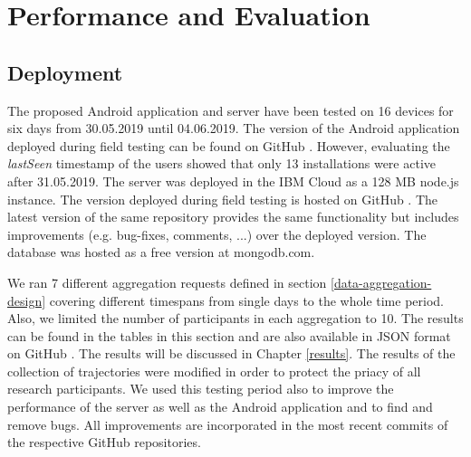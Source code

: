 \chapter{Performance and Evaluation}\label{chapter:performance}
\section{Deployment}\label{deployment}
The proposed Android application and server have been tested on 16 devices for six days from 30.05.2019 until 04.06.2019. The version of the Android application deployed during field testing can be found on GitHub \parencite{final-version-app}. However, evaluating the \textit{lastSeen} timestamp of the users showed that only 13 installations were active after 31.05.2019. The server was deployed in the IBM Cloud as a 128 MB node.js instance. The version deployed during field testing is hosted on GitHub \parencite{final-version-server}. The latest version of the same repository provides the same functionality but includes improvements (e.g. bug-fixes, comments, ...) over the deployed version. The database was hosted as a free version at mongodb.com.

We ran 7 different aggregation requests defined in section \ref{data-aggregation-design} covering different timespans from single days to the whole time period. Also, we limited the number of participants in each aggregation to 10. The results can be found in the tables in this section and are also available in JSON format on GitHub \parencite{github-results}. The results will be discussed in Chapter \ref{results}. The results of the collection of trajectories were modified in order to protect the priacy of all research participants. We used this testing period also to improve the performance of the server as well as the Android application and to find and remove bugs. All improvements are incorporated in the most recent commits of the respective GitHub repositories.


